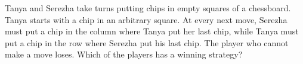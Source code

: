 Tanya and Serezha take turns putting chips in empty squares of a chessboard. Tanya starts with a chip in an arbitrary square. At every next move, Serezha must put a chip in the column where Tanya put her last chip, while Tanya must put a chip in the row where Serezha put his last chip. The player who cannot make a move loses. Which of the players has a winning strategy?